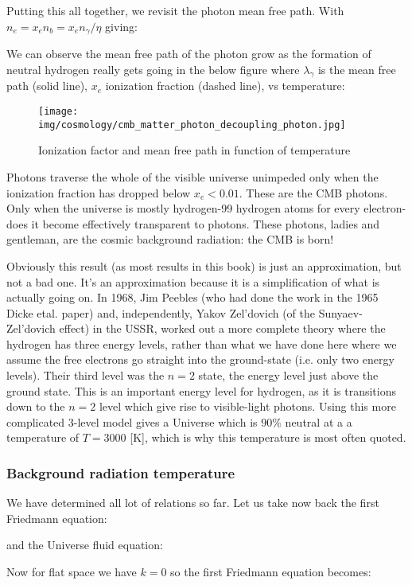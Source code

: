 	Putting this all together, we revisit the photon mean free path. With $n_{e}=x_{e} n_{b}=x_{e}n_{\gamma}/\eta$ giving:
	
	We can observe the mean free path of the photon grow as the formation of neutral hydrogen really gets going in the below figure where $\lambda_{\gamma}$ is the mean free path (solid line), $x_{e}$  ionization fraction (dashed line), vs temperature:
	\begin{figure}[H]
		\centering
		\texttt{[image: img/cosmology/cmb\_matter\_photon\_decoupling\_photon.jpg]}
		\caption{Ionization factor and mean free path in function of temperature}
	\end{figure}
	 Photons traverse the whole of the visible universe unimpeded only when the ionization fraction has dropped below $x_{e}<0.01$. These are the CMB photons.
Only when the universe is mostly hydrogen-99 hydrogen atoms for every electron-does it become effectively transparent to photons. These photons, ladies and gentleman, are the cosmic background radiation: the CMB is born!
	
	Obviously this result (as most results in this book) is just an approximation, but not a bad one. It's an approximation because it is a simplification of what is actually going on. In 1968, Jim Peebles (who had done the work in the 1965 Dicke etal. paper) and, independently, Yakov Zel’dovich (of the Sunyaev-Zel’dovich effect) in the USSR, worked out a more complete theory where the hydrogen has three energy levels, rather than what we have done here where we assume the free electrons go straight into the ground-state (i.e. only two energy levels). Their third level was the $n=2$ state, the energy level just above the ground state. This is an important energy level for hydrogen, as it is transitions down to the $n=2$ level which give rise to visible-light photons. Using this more complicated $3$-level model gives a Universe which is $90\%$ neutral at a a temperature of $T=3000$ [K], which is why this temperature is most often quoted.
	
	\subsubsection{Background radiation temperature}
	We have determined all lot of relations so far. Let us take now back the first Friedmann equation:
	
	and the Universe fluid equation:
	
	Now for flat space we have $k=0$ so the first Friedmann equation becomes:
	
